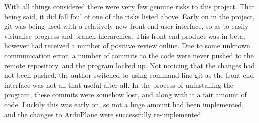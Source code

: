 With all things considered there were very few genuine risks to this project. That being said, it did fall foul of one of the risks listed above. Early on in the project, git was being used with a relatively new front-end user interface, so as to easily visiualise progress and branch hierarchies. This front-end product was in beta, however had received a number of positive review online. Due to some unknown communication error, a number of commits to the code were never pushed to the remote repository, and the program locked up. Not noticing that the changes had not been pushed, the author switched to using command line git as the front-end interface was not all that useful after all. In the process of uninstalling the program, these commits were somehow lost, and along with it a fair amount of code. Luckily this was early on, so not a huge amount had been implemented, and the changes to ArduPlane were successfully re-implemented.
